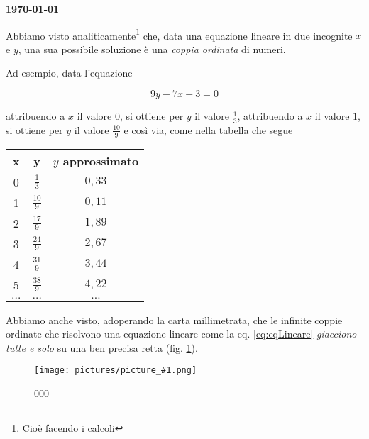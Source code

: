 \documentclass[17pt]{extarticle}
\newcommand{\pict}[1]{
\begin{figure}[h!]		
	\centering
   	\texttt{[image: pictures/picture\_\#1.png]}
  	\caption{#1}
   	\label{fig:LibreOfficeCalc#1}
\end{figure}
}
\begin{document}
\begin{flushright}
{\bf \today}
\end{flushright}

\tableofcontents

\clearpage


Abbiamo visto analiticamente\footnote{Cioè facendo i calcoli} che, data una equazione lineare in due incognite $x$ e $y$, una sua possibile soluzione è una \emph{coppia ordinata} di numeri. 


Ad esempio, data l'equazione 

\begin{equation}\label{eq:eqLineare}
	9y - 7x - 3 = 0
\end{equation}

attribuendo a $x$ il valore $0$, si ottiene per $y$ il valore $\frac{1}{3}$, attribuendo a $x$ il valore $1$, si ottiene per $y$ il valore $\frac{10}{9}$ e così via, come nella tabella che segue


\begin{center}
\begin{tabular}%
	{ |c|c| c| }
 \hline
 {\bf x} &  {\bf y} &  $y$ approssimato \\ 
 \hline
 0 & $\frac{1}{3}$  &  $0,33$ \\
 1 & $\frac{10}{9}$ &  $0,11$ \\ 
 2 & $\frac{17}{9}$ &  $1,89$ \\ 
 3 & $\frac{24}{9}$ &  $2,67$ \\ 
 4 & $\frac{31}{9}$ &  $3,44$ \\ 
 5 & $\frac{38}{9}$ &  $4,22$ \\ 
$\dots$ & $\dots$	& $\dots$\\	
 \hline

\end{tabular}
\end{center}



Abbiamo anche visto, adoperando la carta millimetrata, che le infinite coppie ordinate che risolvono una equazione lineare come la eq. \ref{eq:eqLineare} \emph{giacciono tutte e solo} su una ben precisa retta (fig. \ref{fig:LibreOfficeCalc000}). 



\pict{000}
\end{document}
